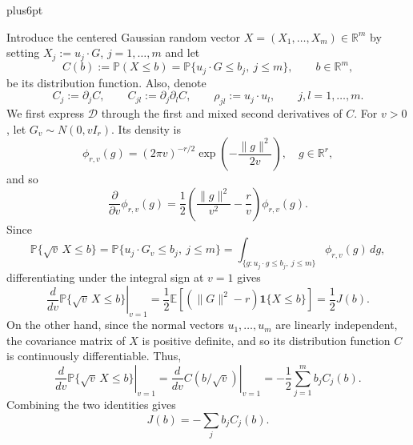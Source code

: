 \documentclass[11pt,letterpaper,twoside,leqno]{article}
\makeatletter
\theoremstyle{bookplain}
\theoremstyle{bookremark}
\renewenvironment{proof}[1][\proofname]{\par
  \pushQED{\qed}\normalfont\topsep6pt plus6pt\relax
  \trivlist\item[\hskip\labelsep\bfseries #1\@addpunct{.}]\ignorespaces
}{\popQED\endtrivlist\@endpefalse}
\newcommand{\E}{\mathbb E}
\newcommand{\Pp}{\mathbb P}
\newcommand{\R}{\mathbb R}
\makeatother
\begin{document}
\begin{proof}
Introduce the centered Gaussian random vector $X=(X_1,\dots,X_m)\in\R^m$ by setting $X_j := u_j\cdot G$, $j=1,\dots,m$ and let
\[
 C(b):=\Pp(X\leq b) = \Pp\{u_j\cdot G\le b_j,\ j\le m\},\qquad b\in\R^m,
\]
be its distribution function. Also, denote
\[
 C_j:=\partial_jC,\qquad C_{jl}:=\partial_j\partial_lC,
 \qquad \rho_{jl}:=u_j\cdot u_l,\qquad j, l=1,\dots, m.
\]
We first express \(\mathcal D\) through the first and mixed second
derivatives of \(C\). For $v>0$, let \(G_v\sim N(0,vI_r)\). Its density is
\[
\phi_{r, v}(g)
=(2\pi v)^{-r/2}\exp\left(-\frac{\|g\|^2}{2v}\right),\quad g\in\R^r,
\]
and so
\[
\frac{\partial}{\partial v}\phi_{r, v}(g)
=\frac12\left(\frac{\|g\|^2}{v^2}-\frac rv\right)
\phi_{r, v}(g).
\]
Since
\[
\Pp\{\sqrt v\,X\le b\}=\Pp\{u_j\cdot G_v\le b_j,\ j\le m\}
=\int_{\{g:u_j\cdot g\le b_j,\ j\le m\}}
\phi_{r,v}(g)\,dg,
\]
differentiating under the integral sign at \(v=1\) gives
\[
\left.\frac{d}{dv}\Pp\{\sqrt v\,X\le b\}\right|_{v=1}
=\frac12\E\left[
(\|G\|^2-r)\mathbf 1\{X\le b\}
\right]
=\frac12J(b).
\]
On the other hand, since the normal vectors $u_1,\dots, u_m$ are linearly independent, the covariance matrix of $X$ is positive definite, and so its distribution function $C$ is continuously differentiable. Thus, 
\[
\left.\frac{d}{dv}\Pp\{\sqrt v\,X\le b\}\right|_{v=1} = \left.\frac{d}{dv}C(b/\sqrt v)\right|_{v=1}
=-\frac12\sum_{j=1}^m b_jC_j(b).
\]
Combining the two identities gives
\begin{equation}\label{appx-an:radial-trace}
J(b)=-\sum_{j} b_jC_j(b).
\end{equation}


\end{proof}
\end{document}
